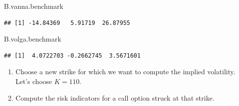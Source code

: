 \documentclass[
]{article}
\newenvironment{Shaded}{\begin{snugshade}}{\end{snugshade}}
\newcommand{\NormalTok}[1]{#1}
\begin{document}
\begin{Shaded}
\begin{Highlighting}[]
\NormalTok{B.vanna.benchmark}
\end{Highlighting}
\end{Shaded}

\begin{verbatim}
## [1] -14.84369   5.91719  26.87955
\end{verbatim}

\begin{Shaded}
\begin{Highlighting}[]
\NormalTok{B.volga.benchmark}
\end{Highlighting}
\end{Shaded}

\begin{verbatim}
## [1]  4.0722703 -0.2662745  3.5671601
\end{verbatim}

\begin{enumerate}
\def\labelenumi{\arabic{enumi}.}
\setcounter{enumi}{2}
\item
  Choose a new strike for which we want to compute the implied
  volatility. Let's choose \(K=110\).
\item
  Compute the risk indicators for a call option struck at that strike.
\end{enumerate}
\end{document}
